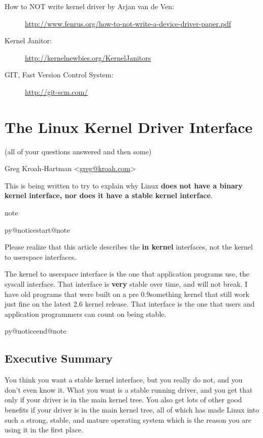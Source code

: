 \documentclass[a4paper,8pt,english]{sphinxmanual}
\makeatletter
\renewenvironment{notice}[2]{%
          \def\py@noticetype{#1}
          \begin{coloredbox}{#1}
          \bf\it
          \par\strong{#2}
          \csname py@noticestart@#1\endcsname
        }
	{
          \csname py@noticeend@\py@noticetype\endcsname
          \end{coloredbox}
        }
\makeatother
\begin{document}
\begin{description}
\item[{How to NOT write kernel driver by Arjan van de Ven:}] \leavevmode
\href{http://www.fenrus.org/how-to-not-write-a-device-driver-paper.pdf}{http://www.fenrus.org/how-to-not-write-a-device-driver-paper.pdf}

\item[{Kernel Janitor:}] \leavevmode
\href{http://kernelnewbies.org/KernelJanitors}{http://kernelnewbies.org/KernelJanitors}

\item[{GIT, Fast Version Control System:}] \leavevmode
\href{http://git-scm.com/}{http://git-scm.com/}

\end{description}


\chapter{The Linux Kernel Driver Interface}
\label{process/stable-api-nonsense:stable-api-nonsense}\label{process/stable-api-nonsense:the-linux-kernel-driver-interface}\label{process/stable-api-nonsense::doc}
(all of your questions answered and then some)

Greg Kroah-Hartman \textless{}\href{mailto:greg@kroah.com}{greg@kroah.com}\textgreater{}

This is being written to try to explain why Linux \textbf{does not have a binary
kernel interface, nor does it have a stable kernel interface}.

\begin{notice}{note}{Note:}
Please realize that this article describes the \textbf{in kernel} interfaces, not
the kernel to userspace interfaces.

The kernel to userspace interface is the one that application programs use,
the syscall interface.  That interface is \textbf{very} stable over time, and
will not break.  I have old programs that were built on a pre 0.9something
kernel that still work just fine on the latest 2.6 kernel release.
That interface is the one that users and application programmers can count
on being stable.
\end{notice}


\section{Executive Summary}
\label{process/stable-api-nonsense:executive-summary}
You think you want a stable kernel interface, but you really do not, and
you don't even know it.  What you want is a stable running driver, and
you get that only if your driver is in the main kernel tree.  You also
get lots of other good benefits if your driver is in the main kernel
tree, all of which has made Linux into such a strong, stable, and mature
operating system which is the reason you are using it in the first
place.
\end{document}
